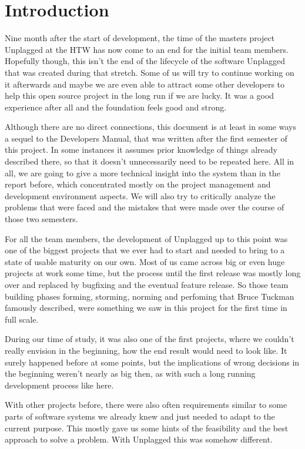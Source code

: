 \chapter*{Introduction}

Nine month after the start of development, the time of the masters project Unplagged at the HTW has now come to an end for the 
initial team members. Hopefully though, 
this isn't the end of the lifecycle of the software Unplagged that was created during that stretch. Some of us will try to continue working on it afterwards and maybe we are even able to attract some other developers to help this open source project in the long run if we are lucky. It was a good experience after all and the foundation feels good and strong.

Although there are no direct connections, this document is at least in some ways a sequel to the Developers Manual, that was
written after the first semester of this project. In some instances it assumes prior knowledge of things already described there, so that it doesn't unnecessarily need to be repeated here.
All in all, we are going to give a more technical insight into the system than in the report before, which concentrated mostly
on the project management and development environment aspects. We will also try to critically 
analyze the problems that were faced and the mistakes that were made over the course of those
two semesters.

For all the team members, the development of Unplagged up to this point was one of 
the biggest 
projects that we ever had to start and needed to bring to a state of usable 
maturity on our own. Most of us came across big or even huge projects at work some time, but the process until 
the first release was mostly long over and replaced by bugfixing and the eventual feature release.
So those team building phases forming, storming, norming and perfoming that Bruce Tuckman famously described\citep{tuckman1965},
were something we saw in this project for the first time in full scale.

During our time of study, it was also one of the first projects, 
where we couldn't really envision in the beginning, how the end result would need to look like. It surely happened before at some points, but the implications of wrong decisions in the beginning weren't nearly as big then, as with such a long running development process like here.

With other projects before, there were also often requirements similar to some
parts of software systems we already knew and just needed to adapt to the current purpose.
This mostly gave us some hints of the feasibility and the best approach to solve a problem.
With Unplagged this was somehow different.

